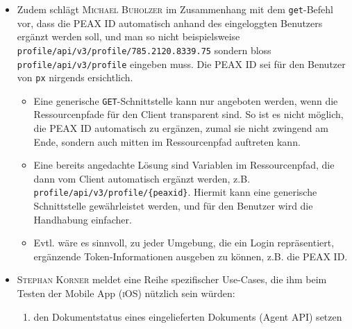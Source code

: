 \begin{itemize}
\begin{itemize}
        \item \textsc{Go} bietet jedoch mit \texttt{json.Indent} eine sehr komfortable Funktion, womit ein beliebiger JSON-Payload\footnote{D.h. nicht nur ein JSON-Payload, dessen Struktur mittels einer \texttt{struct} und den entsprechenden Annotations beschrieben ist, was zu einem unverhältnismässigen Mehraufwand führen würde, zumal dann jeder mögliche Payload statisch beschrieben sein müsste.} einfach formatiert werden kann.
        \item Der Vorschlag soll umgesetzt werden. Weitere Features im Zusammenhang mit generischer JSON-Verarbeitung sollen jedoch der \textsc{Unix}-Philosophie entsprechend an \texttt{jq} oder ähnliche Programme mittels Pipe delegiert werden.
    \end{itemize}
\item Zudem schlägt \textsc{Michael Buholzer} im Zusammenhang mit dem \texttt{get}-Befehl vor, dass die PEAX ID automatisch anhand des eingeloggten Benutzers ergänzt werden soll, und man so nicht beispielsweise \texttt{profile/api/v3/profile/785.2120.8339.75} sondern bloss \texttt{profile/api/v3/profile} eingeben muss. Die PEAX ID sei für den Benutzer von \texttt{px} nirgends ersichtlich.
    \begin{itemize}
        \item Eine generische \texttt{GET}-Schnittstelle kann nur angeboten werden, wenn die Ressourcenpfade für den Client transparent sind. So ist es nicht möglich, die PEAX ID automatisch zu ergänzen, zumal sie nicht zwingend am Ende, sondern auch mitten im Ressourcenpfad auftreten kann.
        \item Eine bereits angedachte Lösung sind Variablen im Ressourcenpfad, die dann vom Client automatisch ergänzt werden, z.B. \texttt{profile/api/v3/profile/\{peaxid\}}. Hiermit kann eine generische Schnittstelle gewährleistet werden, und für den Benutzer wird die Handhabung einfacher.
        \item Evtl. wäre es sinnvoll, zu jeder Umgebung, die ein Login repräsentiert, ergänzende Token-Informationen ausgeben zu können, z.B. die PEAX ID.
    \end{itemize}
    \item \textsc{Stephan Korner} meldet eine Reihe spezifischer Use-Cases, die ihm beim Testen der Mobile App (\textsc{iOS}) nützlich sein würden:
        \begin{enumerate}
            \item den Dokumentstatus eines eingelieferten Dokuments (Agent API) setzen

\end{enumerate}
\end{itemize}
